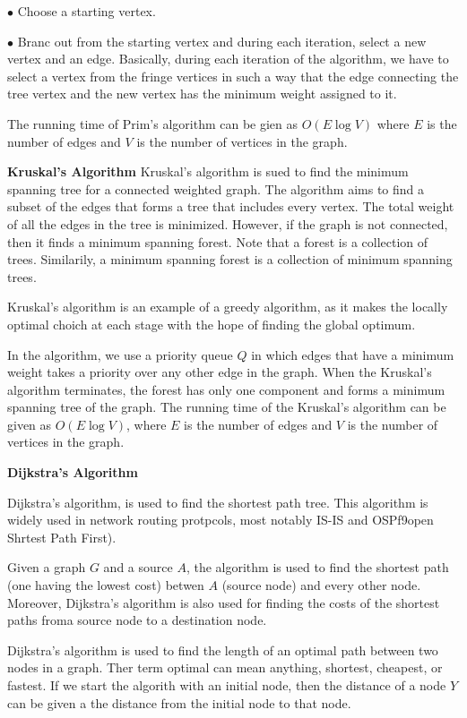 \vskip 3mm
\qquad$\bullet$ Choose a starting vertex.

\vskip 3mm
\qquad$\bullet$ Branc out from the starting vertex and during each iteration, select a new vertex and an edge. Basically, during each iteration of the algorithm, we have to select a vertex from the fringe vertices in such a way that the edge connecting the tree vertex and the new vertex has the minimum weight assigned to it.

\vskip 1mm
The running time of Prim's algorithm can be gien as $O(E\log V)$ where $E$ is the number of edges and $V$ is the number of vertices in the graph.

\filbreak
\vskip 1cm
{\bf Kruskal's Algorithm}
\vskip 1mm
Kruskal's algorithm is sued to find the minimum spanning tree for a connected weighted graph. The algorithm aims to find a subset of the edges that forms a tree that includes every vertex. The total weight of all the edges in the tree is minimized. However, if the graph is not connected, then it finds a minimum spanning forest. Note that a forest is a collection of trees. Similarily, a minimum spanning forest is a collection of minimum spanning trees.

\vskip 1mm
Kruskal's algorithm is an example of a greedy algorithm, as it makes the locally optimal choich at each stage with the hope of finding the global optimum.

\vskip 1mm
In the algorithm, we use a priority queue $Q$ in which edges that have a minimum weight takes a priority over any other edge in the graph. When the Kruskal's algorithm terminates, the forest has only one component and forms a minimum spanning tree of the graph. The running time of the Kruskal's algorithm can be given as $O(E\log V)$, where $E$ is the number of edges and $V$ is the number of vertices in the graph.

\filbreak
\vskip 1cm
{\bf Dijkstra's Algorithm}

Dijkstra's algorithm, is used to find the shortest path tree. This algorithm is widely used in network routing protpcols, most notably IS-IS and OSPf9open Shrtest Path First).

\vskip 1mm
Given a graph $G$ and a source $A$, the algorithm is used to find the shortest path (one having the lowest cost) betwen $A$ (source node) and every other node. Moreover, Dijkstra's algorithm is also used for finding the costs of the shortest paths froma source node to a destination node.

\vskip 3mm
Dijkstra's algorithm is used to find the length of an optimal path between two nodes in a graph. Ther term optimal can mean anything, shortest, cheapest, or fastest. If we start the algorith with an initial node, then the distance of a node $Y$ can be given a the distance from the initial node to that node.

